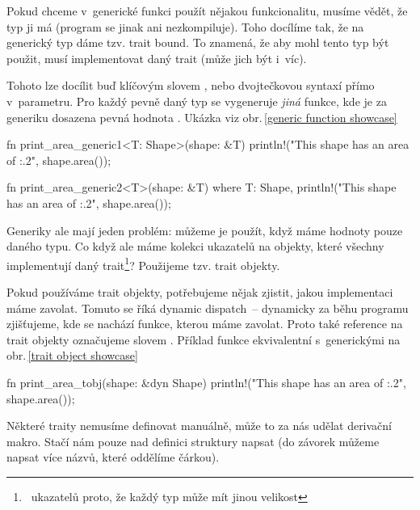 \documentclass[main.tex]{subfiles}
\begin{document}

Pokud chceme v~generické funkci použít nějakou funkcionalitu, musíme vědět, že typ ji má
(program se jinak ani nezkompiluje). Toho docílíme tak, že na generický typ dáme tzv.
trait bound. To znamená, že aby mohl tento typ být použit, musí implementovat daný trait
(může jich být i~víc). \cite[sekce\,10.2]{thebook}

Tohoto lze docílit buď klíčovým slovem , nebo dvojtečkovou syntaxí přímo
v~parametru. Pro každý pevně daný typ se vygeneruje \emph{jiná} funkce, kde je za generiku
dosazena pevná hodnota \cite[sekce\,10.1]{thebook}.
Ukázka viz obr.\,\ref{generic function showcase}

\obrazek
\begin{rustcode}
    fn print_area_generic1<T: Shape>(shape: &T) {
        println!("This shape has an area of {:.2}", shape.area());
    }

    fn print_area_generic2<T>(shape: &T)
    where
        T: Shape,
    {
        println!("This shape has an area of {:.2}", shape.area());
    }
\end{rustcode}


Generiky ale mají jeden problém: můžeme je použít, když máme hodnoty pouze daného typu.
Co když ale máme kolekci ukazatelů na objekty, které všechny implementují daný
trait\footnote{~ukazatelů proto, že každý typ může mít jinou velikost}? Použijeme tzv.
trait objekty.

Pokud používáme trait objekty, potřebujeme nějak zjistit, jakou implementaci máme zavolat.
Tomuto se říká dynamic dispatch~-- dynamicky za běhu programu zjišťujeme, kde se nachází
funkce, kterou máme zavolat. Proto také reference na trait objekty označujeme slovem
. \cite[sekce\,17.2]{thebook} Příklad funkce ekvivalentní s~generickými na
obr.\,\ref{trait object showcase}

\obrazek
\begin{rustcode}
    fn print_area_tobj(shape: &dyn Shape) {
        println!("This shape has an area of {:.2}", shape.area());
    }
\end{rustcode}


Některé traity nemusíme definovat manuálně, může to za nás udělat derivační makro. Stačí
nám pouze nad definici struktury napsat  (do závorek můžeme
napsat více názvů, které oddělíme čárkou). \cite[sekce\,5.2]{thebook}
\end{document}
